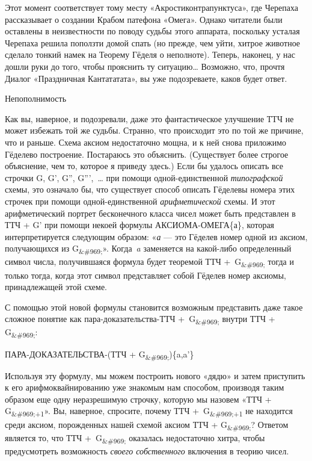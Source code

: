 Этот момент соответствует тому месту «Акростиконтрапунктуса», где Черепаха рассказывает о создании Крабом патефона «Омега». Однако читатели были оставлены в неизвестности по поводу судьбы этого аппарата, поскольку усталая Черепаха решила поползти домой спать (но прежде, чем уйти, хитрое животное сделало тонкий намек на Теорему Гёделя о неполноте). Теперь, наконец, у нас дошли руки до того, чтобы прояснить ту ситуацию\ldots{} Возможно, что, прочтя Диалог «Праздничная Кантататата», вы уже подозреваете, каков будет ответ.

Непополнимость

Как вы, наверное, и подозревали, даже это фантастическое улучшение ТТЧ не может избежать той же судьбы. Странно, что происходит это по той же причине, что и раньше. Схема аксиом недостаточно мощна, и к ней снова приложимо Гёделево построение. Постараюсь это объяснить. (Существует более строгое объяснение, чем то, которое я приведу здесь.) Если бы удалось описать все строчки G, G', G'', G''',~\ldots{} при помощи одной-единственной \emph{типографской} схемы, это означало бы, что существует способ описать Гёделевы номера этих строчек при помощи одной-единственной \emph{арифметической} схемы. И этот арифметический портрет бесконечного класса чисел может быть представлен в ТТЧ + G' при помощи некоей формулы АКСИОМА-ОМЕГА\{а\}, которая интерпретируется следующим образом: «\emph{а} --- это Гёделев номер одной из аксиом, получающихся из G\textsubscript{\&\#969;}». Когда~\emph{a} заменяется на какой-либо определенный символ числа, получившаяся формула будет теоремой ТТЧ +~G\textsubscript{\&\#969;} тогда и только тогда, когда этот символ представляет собой Гёделев номер аксиомы, принадлежащей этой схеме.

С помощью этой новой формулы становится возможным представить даже такое сложное понятие как пара-доказательства-ТТЧ +~G\textsubscript{\&\#969;} внутри ТТЧ + G\textsubscript{\&\#969;}:

ПАРА-ДОКАЗАТЕЛЬСТВА-(ТТЧ + G\textsubscript{\&\#969;})\{a,a'\}

Используя эту формулу, мы можем построить нового «дядю» и затем приступить к его арифмоквайнированию уже знакомым нам способом, производя таким образом еще одну неразрешимую строчку, которую мы назовем «ТТЧ + G\textsubscript{\&\#969;+1}». Вы, наверное, спросите, почему ТТЧ +~G\textsubscript{\&\#969;+1} не находится среди аксиом, порожденных нашей схемой аксиом ТТЧ + G\textsubscript{\&\#969;}? Ответом является то, что ТТЧ +~G\textsubscript{\&\#969;} оказалась недостаточно хитра, чтобы предусмотреть возможность \emph{своего собственного} включения в теорию чисел.

